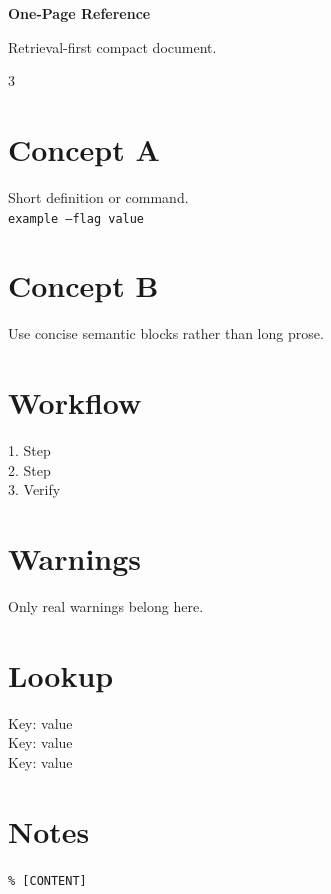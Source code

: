 \documentclass[9.5pt,a4paper]{scrartcl}
\begin{document}
{\Huge\bfseries One-Page Reference\par}{\color{Accent} Retrieval-first compact document.\par}\vspace{.8em}
\begin{multicols}{3}
\section*{Concept A}Short definition or command.\\\texttt{example --flag value}
\section*{Concept B}Use concise semantic blocks rather than long prose.
\columnbreak\section*{Workflow}1. Step\\2. Step\\3. Verify
\section*{Warnings}Only real warnings belong here.
\columnbreak\section*{Lookup}Key: value\\Key: value\\Key: value
\section*{Notes}\texttt{\% [CONTENT]}
\end{multicols}
\end{document}
